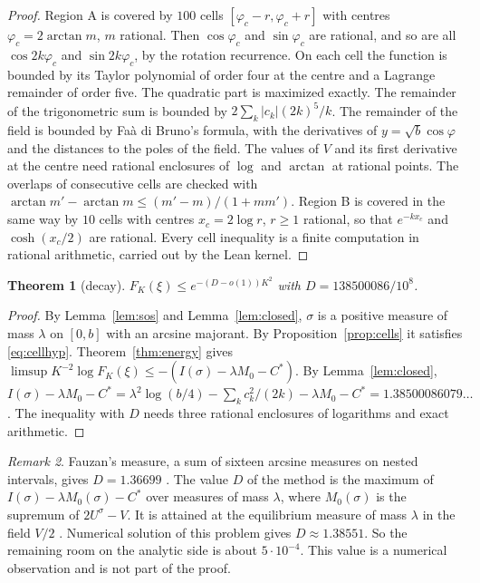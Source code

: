 \documentclass[11pt]{amsart}
\newtheorem{theorem}{Theorem}[section]
\theoremstyle{definition}
\theoremstyle{remark}
\newtheorem{remark}[theorem]{Remark}
\numberwithin{equation}{section}
\begin{document}
\begin{proof}
Region A is covered by $100$ cells $[\varphi_c-r,\varphi_c+r]$ with centres $\varphi_c=2\arctan m$, $m$ rational. Then
$\cos\varphi_c$ and $\sin\varphi_c$ are rational, and so are all $\cos2k\varphi_c$ and $\sin2k\varphi_c$, by the
rotation recurrence. On each cell the function is bounded by its Taylor polynomial of order four at the centre and a
Lagrange remainder of order five. The quadratic part is maximized exactly. The remainder of the trigonometric sum is
bounded by $2\sum_k|c_k|(2k)^5/k$. The remainder of the field is bounded by Fa\`a di Bruno's formula, with the
derivatives of $y=\sqrt b\cos\varphi$ and the distances to the poles of the field. The values of $V$ and its first
derivative at the centre need rational enclosures of $\log$ and $\arctan$ at rational points. The overlaps of
consecutive cells are checked with $\arctan m'-\arctan m\le(m'-m)/(1+mm')$. Region B is covered in the same way by
$10$ cells with centres $x_c=2\log r$, $r\ge1$ rational, so that $e^{-kx_c}$ and $\cosh(x_c/2)$ are rational. Every
cell inequality is a finite computation in rational arithmetic, carried out by the Lean kernel.
\end{proof}

\begin{theorem}[decay]\label{thm:decay}
$F_K(\xi)\le e^{-(D-o(1))K^2}$ with $D=138500086/10^8$.
\end{theorem}

\begin{proof}
By Lemma~\ref{lem:sos} and Lemma~\ref{lem:closed}, $\sigma$ is a positive measure of mass $\lambda$ on $[0,b]$ with an
arcsine majorant. By Proposition~\ref{prop:cells} it satisfies \eqref{eq:cellhyp}. Theorem~\ref{thm:energy} gives
$\limsup K^{-2}\log F_K(\xi)\le-(I(\sigma)-\lambda M_0-C^*)$. By Lemma~\ref{lem:closed},
$I(\sigma)-\lambda M_0-C^*=\lambda^2\log(b/4)-\sum_kc_k^2/(2k)-\lambda M_0-C^*=1.38500086079\ldots$. The inequality
with $D$ needs three rational enclosures of logarithms and exact arithmetic.
\end{proof}

\begin{remark}
Fauzan's measure, a sum of sixteen arcsine measures on nested intervals, gives $D=1.36699$
\cite[Lemma~6.1]{Fauzan2026}. The value $D$ of the method is the maximum of $I(\sigma)-\lambda M_0(\sigma)-C^*$ over
measures of mass $\lambda$, where $M_0(\sigma)$ is the supremum of $2U^\sigma-V$. It is attained at the equilibrium
measure of mass $\lambda$ in the field $V/2$ \cite{SaffTotik}. Numerical solution of this problem gives
$D\approx1.38551$. So the remaining room on the analytic side is about $5\cdot10^{-4}$. This value is a numerical
observation and is not part of the proof.
\end{remark}
\end{document}
